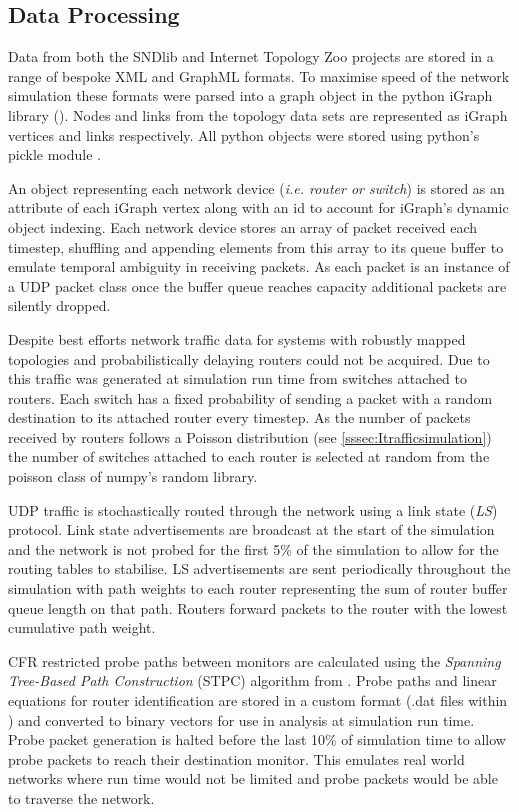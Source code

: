 \subsection{Data Processing}
\label{ssec:Mdataprocessing}
Data from both the SNDlib and Internet Topology Zoo projects are stored in a range of bespoke XML and GraphML formats. To maximise speed of the network simulation these formats were parsed into a graph object in the python iGraph library (\cite{csardi_igraph_2006}). Nodes and links from the topology data sets are represented as iGraph vertices and links respectively. All python objects were stored using python's pickle module \cite{van_rossum_python_2020}.\par
An object representing each network device (\textit{i.e. router or switch}) is stored as an attribute of each iGraph vertex along with an id to account for iGraph's dynamic object indexing. Each network device stores an array of packet received each timestep, shuffling and appending elements from this array to its queue buffer to emulate temporal ambiguity in receiving packets. As each packet is an instance of a UDP packet class once the buffer queue reaches capacity additional packets are silently dropped.\par
Despite best efforts network traffic data for systems with robustly mapped topologies and probabilistically delaying routers could not be acquired. Due to this traffic was generated at simulation run time from switches attached to routers. Each switch has a fixed probability of sending a packet with a random destination to its attached router every timestep. As the number of packets received by routers follows a Poisson distribution (see \cref{sssec:Itrafficsimulation}) the number of switches attached to each router is selected at random from the poisson class of numpy's random library.\par
UDP traffic is stochastically routed through the network using a link state (\textit{LS}) protocol. Link state advertisements are broadcast at the start of the simulation and the network is not probed for the first 5\% of the simulation to allow for the routing tables to stabilise. LS advertisements are sent periodically throughout the simulation with path weights to each router representing the sum of router buffer queue length on that path. Routers forward packets to the router with the lowest cumulative path weight.\par
CFR restricted probe paths between monitors are calculated using the \textit{Spanning Tree-Based Path Construction} (STPC) algorithm from \cite{he_network_2021}. Probe paths and linear equations for router identification are stored in a custom format (.dat files within \cite{sylvester_millar_real_2021}) and converted to binary vectors for use in analysis at simulation run time. Probe packet generation is halted before the last 10\% of simulation time to allow probe packets to reach their destination monitor. This emulates real world networks where run time would not be limited and probe packets would be able to traverse the network.\par
